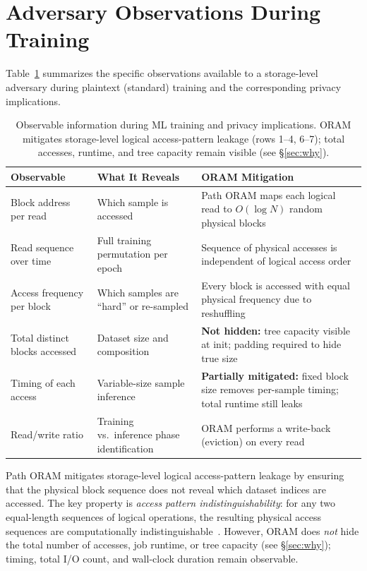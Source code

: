 \documentclass[11pt]{article}
\begin{document}
\section{Adversary Observations During Training}
\label{sec:adversary}

Table~\ref{tab:adversary} summarizes the specific observations available to a storage-level adversary during plaintext (standard) training and the corresponding privacy implications.

\begin{table}[ht]
\centering
\caption{Observable information during ML training and privacy implications. ORAM mitigates storage-level logical access-pattern leakage (rows 1--4, 6--7); total accesses, runtime, and tree capacity remain visible (see \S\ref{sec:why}).}
\label{tab:adversary}
\begin{tabular}{@{}p{4.2cm}p{4.5cm}p{4.5cm}@{}}
\toprule
\textbf{Observable} & \textbf{What It Reveals} & \textbf{ORAM Mitigation} \\
\midrule
Block address per read & Which sample is accessed & Path ORAM maps each logical read to $O(\log N)$ random physical blocks \\
\addlinespace
Read sequence over time & Full training permutation per epoch & Sequence of physical accesses is independent of logical access order \\
\addlinespace
Access frequency per block & Which samples are ``hard'' or re-sampled & Every block is accessed with equal physical frequency due to reshuffling \\
\addlinespace
Total distinct blocks accessed & Dataset size and composition & \textbf{Not hidden:} tree capacity visible at init; padding required to hide true size \\
\addlinespace
Timing of each access & Variable-size sample inference & \textbf{Partially mitigated:} fixed block size removes per-sample timing; total runtime still leaks \\
\addlinespace
Read/write ratio & Training vs.\ inference phase identification & ORAM performs a write-back (eviction) on every read \\
\bottomrule
\end{tabular}
\end{table}

Path ORAM mitigates storage-level logical access-pattern leakage by ensuring that the physical block sequence does not reveal which dataset indices are accessed.
The key property is \emph{access pattern indistinguishability}: for any two equal-length sequences of logical operations, the resulting physical access sequences are computationally indistinguishable~\cite{stefanov2013}.
However, ORAM does \emph{not} hide the total number of accesses, job runtime, or tree capacity (see \S\ref{sec:why}); timing, total I/O count, and wall-clock duration remain observable.
\end{document}
